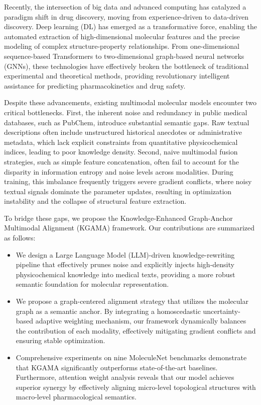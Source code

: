 \documentclass[journal]{IEEEtran}
\begin{document}
Recently, the intersection of big data and advanced computing has catalyzed a paradigm shift in drug discovery, moving from experience-driven to data-driven discovery. Deep learning (DL) has emerged as a transformative force, enabling the automated extraction of high-dimensional molecular features and the precise modeling of complex structure-property relationships. From one-dimensional sequence-based Transformers to two-dimensional graph-based neural networks (GNNs), these technologies have effectively broken the bottleneck of traditional experimental and theoretical methods, providing revolutionary intelligent assistance for predicting pharmacokinetics and drug safety.

Despite these advancements, existing multimodal molecular models encounter two critical bottlenecks. First, the inherent noise and redundancy in public medical databases, such as PubChem, introduce substantial semantic gaps. Raw textual descriptions often include unstructured historical anecdotes or administrative metadata, which lack explicit constraints from quantitative physicochemical indices, leading to poor knowledge density. Second, naive multimodal fusion strategies, such as simple feature concatenation, often fail to account for the disparity in information entropy and noise levels across modalities. During training, this imbalance frequently triggers severe gradient conflicts, where noisy textual signals dominate the parameter updates, resulting in optimization instability and the collapse of structural feature extraction.

To bridge these gaps, we propose the Knowledge-Enhanced Graph-Anchor Multimodal Alignment (KGAMA) framework. Our contributions are summarized as follows:

\begin{itemize}
    \item We design a Large Language Model (LLM)-driven knowledge-rewriting pipeline that effectively prunes noise and explicitly injects high-density physicochemical knowledge into medical texts, providing a more robust semantic foundation for molecular representation.
    \item We propose a graph-centered alignment strategy that utilizes the molecular graph as a semantic anchor. By integrating a homoscedastic uncertainty-based adaptive weighting mechanism, our framework dynamically balances the contribution of each modality, effectively mitigating gradient conflicts and ensuring stable optimization.
    \item Comprehensive experiments on nine MoleculeNet benchmarks demonstrate that KGAMA significantly outperforms state-of-the-art baselines. Furthermore, attention weight analysis reveals that our model achieves superior synergy by effectively aligning micro-level topological structures with macro-level pharmacological semantics.
\end{itemize}
\end{document}
